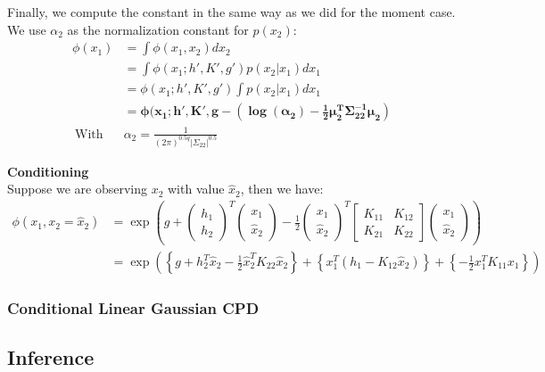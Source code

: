 \documentclass[11pt]{article}
\newcommand{\subsubsubsection}[1]{\noindent\textbf{#1}\\}
\begin{document}
Finally, we compute the constant in the same way as we did for the moment case. We use $\alpha_2$ as the normalization constant for $p(x_2)$:
\begin{align*}
\phi(x_1) &= \int \phi(x_1,x_2)dx_2\\
&= \int \phi(x_1; h', K', g')p(x_2|x_1)dx_1\\
&= \phi(x_1; h', K', g')\int p(x_2|x_1)dx_1\\
&= \bm{\phi(x_1; h', K', g-(\log(\alpha_2)-\frac{1}{2}\mu_2^T \Sigma_{22}^{-1}\mu_2)}\\
~\text{With~}&\alpha_2=\frac{1}{(2\pi)^{0.5q}|\Sigma_{22}|^{0.5}}
\end{align*}

\subsubsubsection{Conditioning}
Suppose we are observing $x_2$ with value $\hat{x}_2$, then we have:
\begin{align*}
\phi(x_1, x_2=\hat{x}_2) &= \exp\left( g + \left( \begin{array}{c} h_1 \\ h_2 \end{array}\right)^T
                                           \left( \begin{array}{c} x_1 \\ \hat{x}_2 \end{array}\right)
- \frac{1}{2} \left( \begin{array}{c} x_1 \\ \hat{x}_2 \end{array}\right)^T
              \left[ \begin{array}{cc} K_{11} & K_{12} \\ K_{21} & K_{22} \end{array} \right]
              \left( \begin{array}{c} x_1 \\ \hat{x}_2 \end{array}\right)
                                        \right)\\
&= \exp \left(
              \left\{ g + h_2^T\hat{x}_2 - \frac{1}{2}\hat{x}_2^T K_{22} \hat{x}_2 \right\} +
              \left\{ x_1^T(h_1-K_{12}\hat{x}_2) \right\} +    
              \left\{ -\frac{1}{2}x_1^T K_{11}x_1 \right\}
        \right)
\end{align*}

\subsubsection{Conditional Linear Gaussian CPD}
\subsection{Inference}
\end{document}
